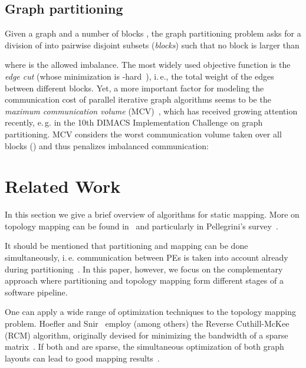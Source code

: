 \documentclass[pdftex]{llncs}
\newcommand{\eg}{e.\,g.\xspace}
\newcommand{\ie}{i.\,e.\xspace}
\begin{document}
\subsection{Graph partitioning}
\label{sub:part_quality}

Given a graph  and a number of blocks , the 
graph partitioning problem asks for a division of  into  pairwise
disjoint subsets  (\emph{blocks}) such that no block
is larger than

where  is the allowed imbalance. The most widely
used objective function 
is the \emph{edge cut} (whose minimization is
-hard~\cite{Garey:1979:CIG:578533}), \ie, the total weight of the edges between
different blocks.  Yet, a more important factor for modeling the communication cost of parallel 
iterative graph algorithms seems to be the \emph{maximum communication volume} (MCV)~\cite{Hendrickson_graphpartitioning}, 
which has received growing attention recently, \eg in the 10th DIMACS Implementation Challenge
on graph partitioning. 
MCV considers the worst
communication volume taken over all blocks  ()
and thus penalizes imbalanced communication:



\section{Related Work}
\label{sub:related}
In this section we give a brief overview of algorithms for static
mapping. 
More on topology mapping can be found
in~\cite{Aubanel09resource,6495451} and particularly in Pellegrini's
survey~\cite{Pellegrini11static}.

It should be mentioned that partitioning and mapping can be done
simultaneously, \ie communication between PEs is taken into account
already during
partitioning~\cite{DBLP:journals/fgcs/WalshawC01,HuangAB06pagrid,MoulitsasK08architecture}.
In this paper, however, we focus on the complementary approach where
partitioning and topology mapping form different stages of a software
pipeline.

One can apply a wide range of optimization techniques to the topology
mapping problem. Hoefler and Snir~\cite{hoefler-topomap} employ (among
others) the Reverse Cuthill-McKee (RCM) algorithm, originally devised
for minimizing the bandwidth of a sparse matrix~\cite{Cuthill69a}. If
both  and  are sparse, the simultaneous optimization of both
graph layouts can lead to good mapping
results~\cite{Pellegrini07scotch}.
\end{document}
